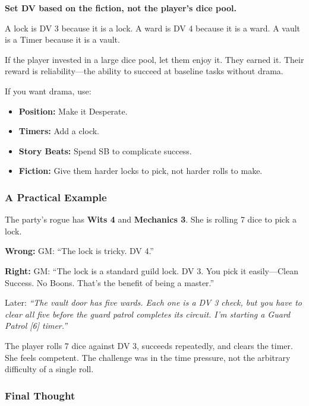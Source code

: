 \begin{tcolorbox}[colback=black!5,colframe=black!75!black,title=The Golden Rule of DV,breakable]
\textbf{Set DV based on the fiction, not the player's dice pool.}

A lock is DV 3 because it is a lock. A ward is DV 4 because it is a ward. A vault is a Timer because it is a vault.

If the player invested in a large dice pool, let them enjoy it. They earned it. Their reward is reliability---the ability to succeed at baseline tasks without drama.

If you want drama, use:
\begin{itemize}
  \item \textbf{Position:} Make it Desperate.
  \item \textbf{Timers:} Add a clock.
  \item \textbf{Story Beats:} Spend SB to complicate success.
  \item \textbf{Fiction:} Give them harder locks to pick, not harder rolls to make.
\end{itemize}
\end{tcolorbox}

\subsubsection{A Practical Example}

The party's rogue has \textbf{Wits 4} and \textbf{Mechanics 3}. She is rolling 7 dice to pick a lock.

\noindent\textbf{Wrong:}
GM: ``The lock is tricky. DV 4.''

\noindent\textbf{Right:}
GM: ``The lock is a standard guild lock. DV 3. You pick it easily---Clean Success. No Boons. That's the benefit of being a master.''

Later: \textit{``The vault door has five wards. Each one is a DV 3 check, but you have to clear all five before the guard patrol completes its circuit. I'm starting a Guard Patrol [6] timer.''}

The player rolls 7 dice against DV 3, succeeds repeatedly, and clears the timer. She feels competent. The challenge was in the time pressure, not the arbitrary difficulty of a single roll.

\subsubsection{Final Thought}

